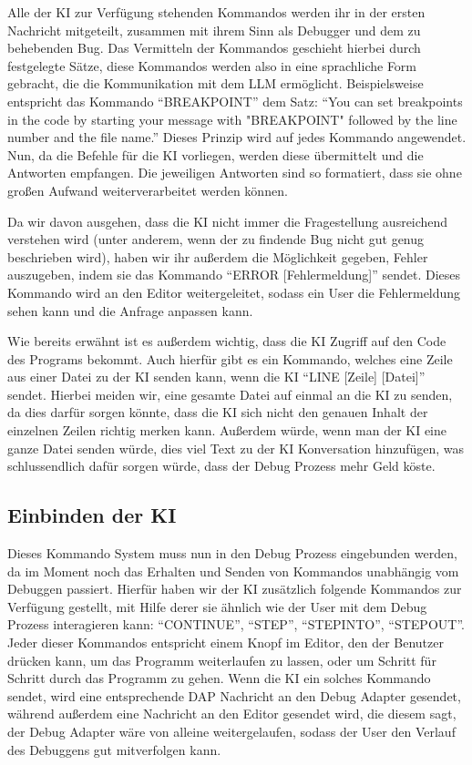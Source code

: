 \documentclass[a4paper,12pt,ngerman]{scrartcl}
\begin{document}
Alle der KI zur Verfügung stehenden Kommandos werden ihr in der ersten Nachricht mitgeteilt, zusammen mit ihrem Sinn als Debugger und dem zu behebenden Bug. Das Vermitteln der Kommandos geschieht hierbei durch festgelegte Sätze, diese Kommandos werden also in eine sprachliche Form gebracht, die die Kommunikation mit dem LLM ermöglicht. Beispielsweise entspricht das Kommando ``BREAKPOINT'' dem Satz: ``You can set breakpoints in the code by starting your message with "BREAKPOINT" followed by the line number and the file name.'' Dieses Prinzip wird auf jedes Kommando angewendet. Nun, da die Befehle für die KI vorliegen, werden diese übermittelt und die Antworten empfangen. Die jeweiligen Antworten sind so formatiert, dass sie ohne großen Aufwand weiterverarbeitet werden können.

Da wir davon ausgehen, dass die KI nicht immer die Fragestellung ausreichend verstehen wird (unter anderem, wenn der zu findende Bug nicht gut genug beschrieben wird), haben wir ihr außerdem die Möglichkeit gegeben, Fehler auszugeben, indem sie das Kommando ``ERROR [Fehlermeldung]'' sendet. Dieses Kommando wird an den Editor weitergeleitet, sodass ein User die Fehlermeldung sehen kann und die Anfrage anpassen kann.

Wie bereits erwähnt ist es außerdem wichtig, dass die KI Zugriff auf den Code des Programs bekommt. Auch hierfür gibt es ein Kommando, welches eine Zeile aus einer Datei zu der KI senden kann, wenn die KI ``LINE [Zeile] [Datei]'' sendet. Hierbei meiden wir, eine gesamte Datei auf einmal an die KI zu senden, da dies darfür sorgen könnte, dass die KI sich nicht den genauen Inhalt der einzelnen Zeilen richtig merken kann. Außerdem würde, wenn man der KI eine ganze Datei senden würde, dies viel Text zu der KI Konversation hinzufügen, was schlussendlich dafür sorgen würde, dass der Debug Prozess mehr Geld köste.

\subsection{Einbinden der KI}

Dieses Kommando System muss nun in den Debug Prozess eingebunden werden, da im Moment noch das Erhalten und Senden von Kommandos unabhängig vom Debuggen passiert. Hierfür haben wir der KI zusätzlich folgende Kommandos zur Verfügung gestellt, mit Hilfe derer sie ähnlich wie der User mit dem Debug Prozess interagieren kann: ``CONTINUE'', ``STEP'', ``STEPINTO'', ``STEPOUT''. Jeder dieser Kommandos entspricht einem Knopf im Editor, den der Benutzer drücken kann, um das Programm weiterlaufen zu lassen, oder um Schritt für Schritt durch das Programm zu gehen. Wenn die KI ein solches Kommando sendet, wird eine entsprechende DAP Nachricht an den Debug Adapter gesendet, während außerdem eine Nachricht an den Editor gesendet wird, die diesem sagt, der Debug Adapter wäre von alleine weitergelaufen, sodass der User den Verlauf des Debuggens gut mitverfolgen kann.
\end{document}
